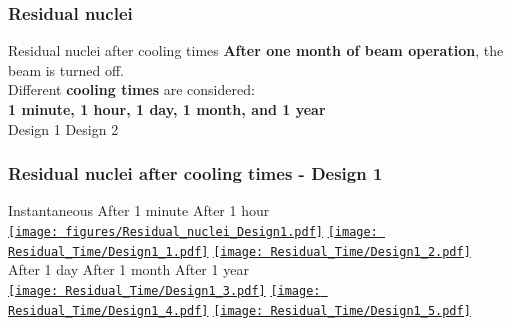 \documentclass[xcolor={dvipsnames}]{beamer}
\begin{document}
\subsubsection{Residual nuclei}
\begin{frame}{Residual nuclei after cooling times}
\textbf{After one month of beam operation}, the beam is turned off.\\
Different \textbf{cooling times} are considered:\\
\textbf{1 minute, 1 hour, 1 day, 1 month, and 1 year}\\
\vspace*{0.3cm}
\hspace*{1.8cm} Design 1 \hfill Design 2 \hspace*{2.3cm} \\
  \begin{center}
  \end{center}
\end{frame}
\begin{frame}
  \frametitle{Residual nuclei after cooling times - \textbf{Design 1}}
  \hypertarget{residualtimesprev_Design1}{}
  \begin{center}
    \hspace*{1cm} Instantaneous \hfill After 1 minute \hfill After 1 hour \hspace*{1.2cm} \\
  \hyperlink{Residual_nuclei_Design1}{\texttt{[image: figures/Residual\_nuclei\_Design1.pdf]}}
  \hyperlink{Residual_nuclei_minute_Design1}{\texttt{[image: Residual\_Time/Design1\_1.pdf]}}
  \hyperlink{Residual_nuclei_hour_Design1}{\texttt{[image: Residual\_Time/Design1\_2.pdf]}}\\
    \hspace*{1cm} After 1 day \hfill After 1 month \hfill After 1 year\hspace*{1.4cm} \\
  \hyperlink{Residual_nuclei_day_Design1}{\texttt{[image: Residual\_Time/Design1\_3.pdf]}}
  \hyperlink{Residual_nuclei_month_Design1}{\texttt{[image: Residual\_Time/Design1\_4.pdf]}}
  \hyperlink{Residual_nuclei_year_Design1}{\texttt{[image: Residual\_Time/Design1\_5.pdf]}}
 \end{center}
\end{frame}
\end{document}
